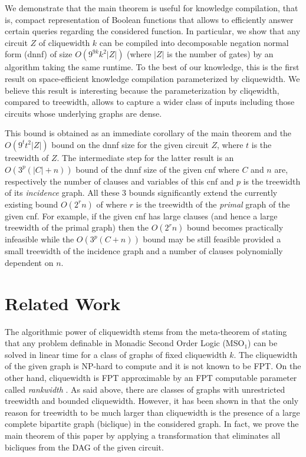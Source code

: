 \documentclass{llncs}
\begin{document}
We demonstrate that the main theorem is useful for knowledge compilation, that is, compact representation of Boolean
functions that allows to efficiently answer certain queries regarding the considered function.
In particular, we show 
that any circuit $Z$ of cliquewidth $k$ can be compiled into decomposable negation normal form
({\sc dnnf}) \cite{DarwicheJACM} of size $O(9^{9k}k^2|Z|)$ (where $|Z|$ is the number of gates)
by an algorithm taking the same runtime. To the best of our knowledge, this is the first result 
on space-efficient knowledge compilation parameterized by cliquewidth. We believe this
result is interesting because the parameterization by
cliqewidth, compared to treewidth, allows to capture a wider class of inputs including those circuits
whose underlying graphs are dense. 

This bound is obtained as an immediate corollary of the main theorem
and the $O(9^{t}t^2|Z|)$ bound on the {\sc dnnf} size for the given circuit $Z$, where $t$ is the treewidth
of $Z$. The intermediate step for the latter result is an $O(3^p(|C|+n))$ bound of the {\sc dnnf} 
size of the given {\sc cnf} where $C$ and $n$ are, respectively the number of clauses and variables
of this {\sc cnf} and $p$ is the treewidth of its \emph{incidence} graph. All these $3$ bounds significantly 
extend the currently existing bound  $O(2^rn)$ of \cite{DarwicheJACM} where $r$ is the treewidth of 
the \emph{primal} graph of the given {\sc cnf}. For example, if the given {\sc cnf} has large clauses (and hence
a large treewidth of the primal graph) then the $O(2^rn)$ bound becomes practically
infeasible while the $O(3^p(C+n))$ bound may be still feasible provided a small treewidth of the incidence
graph and a number of clauses polynomially dependent on $n$.  
\section{Related Work}
The algorithmic power of cliquewidth stems from the meta-theorem of \cite{CoMaRo}
stating that any problem definable in Monadic Second Order Logic (MSO$_1$) can be solved in linear time for a class
of graphs of fixed cliquewidth $k$. The cliquewidth of the given graph is NP-hard to compute \cite{CWNP}
and it is not known to be FPT. On the other hand, cliquewidth is FPT approximable by an FPT computable
parameter called \emph{rankwidth} \cite{CWDApprox,RWDCompute}. As said above, there are classes of graphs with unrestricted treewidth
and bounded cliquewidth. However, it has been shown in \cite{CWDNoBicliques} that the only reason for treewidth to be much larger
than cliquewidth is the presence of a large complete bipartite graph (biclique) in the considered graph. In fact, we prove the main theorem of this 
paper by applying a transformation that eliminates all bicliques from the DAG of the given circuit. 
\end{document}
